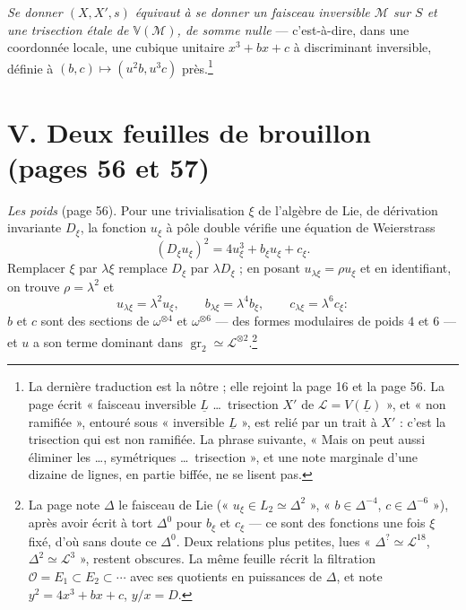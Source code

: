 \documentclass[11pt,a4paper]{article}
\begin{document}
\emph{Se donner $(X, X', s)$ équivaut à se donner un faisceau inversible
$\mathcal{M}$ sur $S$ et une trisection étale de $\mathbb{V}(\mathcal{M})$, de
somme nulle} ---
c'est-à-dire, dans une coordonnée locale, une cubique unitaire $x^3 + bx + c$ à
discriminant inversible, définie à $(b, c) \mapsto (u^2 b, u^3 c)$
près.\footnote{La dernière traduction est la nôtre ; elle rejoint la page 16
et la page 56. La page écrit « faisceau inversible $\underline{L}$ \ldots\
trisection $X'$ de $\mathcal{L} = V(\underline{L})$ », et « non ramifiée »,
entouré sous « inversible $\underline{L}$ », est relié par un trait à $X'$ : c'est
la trisection qui est non ramifiée. La phrase suivante, « Mais on peut aussi
éliminer les \ldots, symétriques \ldots\ trisection », et une note marginale
d'une dizaine de lignes, en partie biffée, ne se lisent pas.}

\section*{V. Deux feuilles de brouillon (pages 56 et 57)}

\emph{Les poids} (page 56). Pour une trivialisation $\xi$ de l'algèbre de Lie,
de dérivation invariante $D_\xi$, la fonction $u_\xi$ à pôle double vérifie
une équation de Weierstrass
\[
(D_\xi u_\xi)^2 = 4u_\xi^3 + b_\xi u_\xi + c_\xi .
\]
Remplacer $\xi$ par $\lambda\xi$ remplace $D_\xi$ par $\lambda D_\xi$ ; en posant
$u_{\lambda\xi} = \rho u_\xi$ et en identifiant, on trouve $\rho = \lambda^2$
et
\[
u_{\lambda\xi} = \lambda^2 u_\xi, \qquad b_{\lambda\xi} = \lambda^4 b_\xi,
\qquad c_{\lambda\xi} = \lambda^6 c_\xi :
\]
$b$ et $c$ sont des sections de $\omega^{\otimes 4}$ et $\omega^{\otimes 6}$
--- des formes modulaires de poids $4$ et $6$ --- et $u$ a son terme dominant
dans $\operatorname{gr}_2 \simeq \mathcal{L}^{\otimes 2}$.\footnote{La page note
$\Delta$ le faisceau de Lie (« $u_\xi \in L_2 \simeq \Delta^2$ »,
« $b \in \Delta^{-4}$, $c \in \Delta^{-6}$ »), après avoir écrit à tort
$\Delta^0$ pour $b_\xi$ et $c_\xi$ --- ce sont des fonctions une fois $\xi$
fixé, d'où sans doute ce $\Delta^0$. Deux relations plus petites, lues
« $\Delta^? \simeq \mathcal{L}^{18}$, $\Delta^2 \simeq \mathcal{L}^3$ », restent
obscures. La même feuille récrit la filtration $\mathcal{O} = E_1 \subset E_2
\subset \cdots$ avec ses quotients en puissances de $\Delta$, et note $y^2 = 4x^3
+ bx + c$, $y/x = D$.}
\end{document}
